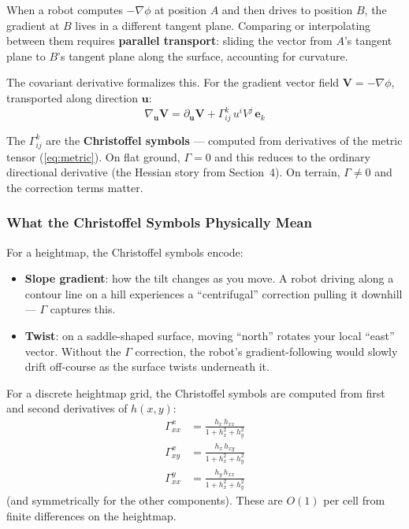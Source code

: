 \documentclass[11pt]{article}
\begin{document}
When a robot computes $-\nabla\phi$ at position $A$ and then drives
to position $B$, the gradient at $B$ lives in a different tangent
plane.  Comparing or interpolating between them requires
\textbf{parallel transport}: sliding the vector from $A$'s tangent
plane to $B$'s tangent plane along the surface, accounting for
curvature.

The covariant derivative formalizes this.  For the gradient vector
field $\mathbf{V} = -\nabla\phi$, transported along direction
$\mathbf{u}$:
\begin{equation}
    \nabla_{\mathbf{u}} \mathbf{V} =
    \partial_{\mathbf{u}} \mathbf{V}
    + \Gamma^k_{ij}\, u^i V^j\, \mathbf{e}_k
    \label{eq:covariant_terrain}
\end{equation}

The $\Gamma^k_{ij}$ are the \textbf{Christoffel symbols} ---
computed from derivatives of the metric tensor (\ref{eq:metric}).
On flat ground, $\Gamma = 0$ and this reduces to the ordinary
directional derivative (the Hessian story from Section~4).
On terrain, $\Gamma \neq 0$ and the correction terms matter.

\subsubsection{What the Christoffel Symbols Physically Mean}

For a heightmap, the Christoffel symbols encode:
\begin{itemize}
    \item \textbf{Slope gradient}: how the tilt changes as you move.
    A robot driving along a contour line on a hill experiences a
    ``centrifugal'' correction pulling it downhill --- $\Gamma$
    captures this.
    \item \textbf{Twist}: on a saddle-shaped surface, moving
    ``north'' rotates your local ``east'' vector.  Without the
    $\Gamma$ correction, the robot's gradient-following would
    slowly drift off-course as the surface twists underneath it.
\end{itemize}

For a discrete heightmap grid, the Christoffel symbols are computed
from first and second derivatives of $h(x,y)$:
\begin{align}
    \Gamma^x_{xx} &= \frac{h_x\, h_{xx}}{1 + h_x^2 + h_y^2}
    \\
    \Gamma^x_{xy} &= \frac{h_x\, h_{xy}}{1 + h_x^2 + h_y^2}
    \\
    \Gamma^y_{xx} &= \frac{h_y\, h_{xx}}{1 + h_x^2 + h_y^2}
\end{align}
(and symmetrically for the other components).  These are $O(1)$ per
cell from finite differences on the heightmap.
\end{document}
